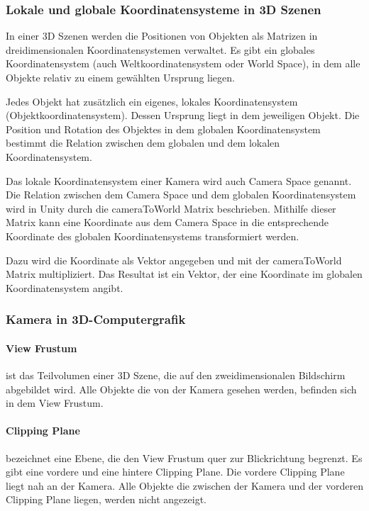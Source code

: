 \subsubsection{Lokale und globale Koordinatensysteme in 3D Szenen}
In einer 3D Szenen werden die Positionen von Objekten als Matrizen in dreidimensionalen Koordinatensystemen verwaltet.
Es gibt ein globales Koordinatensystem (auch Weltkoordinatensystem oder World Space), in dem alle Objekte relativ zu einem gewählten Ursprung liegen. 

Jedes Objekt hat zusätzlich ein eigenes, lokales Koordinatensystem (Objektkoordinatensystem). Dessen Ursprung liegt in dem jeweiligen Objekt.
Die Position und Rotation des Objektes in dem globalen Koordinatensystem bestimmt die Relation zwischen dem globalen und dem lokalen Koordinatensystem. 

Das lokale Koordinatensystem einer Kamera wird auch Camera Space genannt. Die Relation zwischen dem Camera Space und dem globalen Koordinatensystem wird in Unity durch die cameraToWorld Matrix beschrieben. Mithilfe dieser Matrix kann eine Koordinate aus dem Camera Space in die entsprechende Koordinate des globalen Koordinatensystems transformiert werden.\citep{unitycameratoworldmatrix}

Dazu wird die Koordinate als Vektor angegeben und mit der cameraToWorld Matrix multipliziert. Das Resultat ist ein Vektor, der eine Koordinate im globalen Koordinatensystem angibt.\citep{unitycameratoworldmatrix,unitymultiplyoint}

\subsubsection{Kamera in 3D-Computergrafik}
\paragraph{View Frustum}
ist das Teilvolumen einer 3D Szene, die auf den zweidimensionalen Bildschirm abgebildet wird. Alle Objekte die von der Kamera gesehen werden, befinden sich in dem View Frustum.

\paragraph{Clipping Plane}
bezeichnet eine Ebene, die den View Frustum quer zur Blickrichtung begrenzt. 
Es gibt eine vordere und eine hintere Clipping Plane.
Die vordere Clipping Plane liegt nah an der Kamera. Alle Objekte die zwischen der Kamera und der vorderen Clipping Plane liegen, werden nicht angezeigt.


